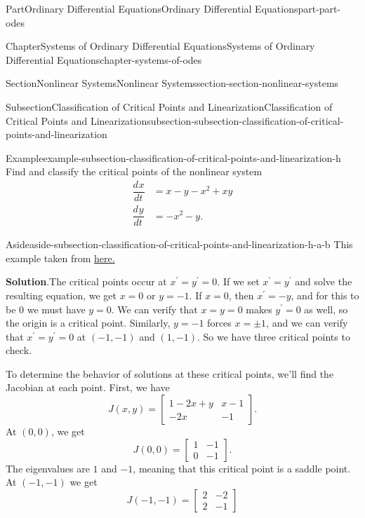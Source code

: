 \documentclass[twoside,10pt,]{book}
\newcommand{\blocktitlefont}{\relax}
\numberwithin{equation}{part}
\newcommand{\dv}[3][]{\dfrac{d^{#1} #2}{d #3^{#1}}}
\begin{document}
\begin{partptx}{Part}{Ordinary Differential Equations}{}{Ordinary Differential Equations}{}{}{part-part-odes}
\begin{chapterptx}{Chapter}{Systems of Ordinary Differential Equations}{}{Systems of Ordinary Differential Equations}{}{}{chapter-systems-of-odes}
\begin{sectionptx}{Section}{Nonlinear Systems}{}{Nonlinear Systems}{}{}{section-section-nonlinear-systems}
\begin{subsectionptx}{Subsection}{Classification of Critical Points and Linearization}{}{Classification of Critical Points and Linearization}{}{}{subsection-subsection-classification-of-critical-points-and-linearization}
\begin{example}{Example}{}{example-subsection-classification-of-critical-points-and-linearization-h}
Find and classify the critical points of the nonlinear system%
\begin{align*}
\dv{x}{t} & = x - y - x^{2} + xy \\
\dv{y}{t} & = -x^{2} - y \text{.}
\end{align*}
%
\begin{aside}{Aside}{}{aside-subsection-classification-of-critical-points-and-linearization-h-a-b}%
This example taken from \href{https://www.math.uci.edu/\~ndonalds/math3d/nonlinear.pdf}{here.}\footnotemark{}%
\end{aside}
\par\smallskip%
\noindent\textbf{\blocktitlefont Solution}.\hypertarget{solution-subsection-classification-of-critical-points-and-linearization-h-b}{}\quad{}The critical points occur at \(x^\prime = y^\prime = 0\). If we set \(x^\prime = y^\prime\) and solve the resulting equation, we get \(x = 0\) or \(y = -1\). If \(x = 0\), then \(x^\prime = -y\), and for this to be \(0\) we must have \(y = 0\). We can verify that \(x = y = 0\) makes \(y^\prime = 0\) as well, so the origin is a critical point. Similarly, \(y = -1\) forces \(x = \pm1\), and we can verify that \(x^\prime = y^\prime = 0\) at \((-1,-1)\) and \((1,-1)\). So we have three critical points to check.%
\par
To determine the behavior of solutions at these critical points, we'll find the Jacobian at each point. First, we have%
\begin{equation*}
J(x,y) = \begin{bmatrix} 1 - 2x + y & x - 1 \\ -2x & -1\end{bmatrix}\text{.}
\end{equation*}
At \((0,0)\), we get%
\begin{equation*}
J(0,0) = \begin{bmatrix} 1 & -1 \\ 0 & -1\end{bmatrix}\text{.}
\end{equation*}
The eigenvalues are \(1\) and \(-1\), meaning that this critical point is a saddle point. At \((-1,-1)\) we get%
\begin{equation*}
J(-1,-1) = \begin{bmatrix}2 & -2 \\ 2 & -1\end{bmatrix}
\end{equation*}

\end{example}
\end{subsectionptx}
\end{sectionptx}
\end{chapterptx}
\end{partptx}
\end{document}
